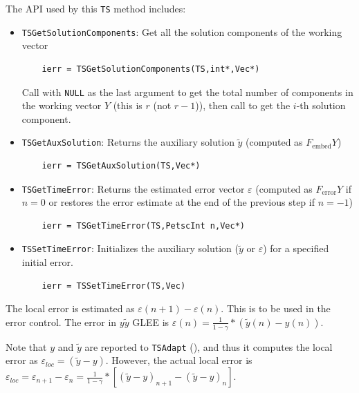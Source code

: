 The API used by this \lstinline{TS} method includes:
\begin{itemize}
  \item \lstinline{TSGetSolutionComponents}: Get all the solution components of the working vector
    \begin{lstlisting}
    ierr = TSGetSolutionComponents(TS,int*,Vec*)
    \end{lstlisting}
    Call with \lstinline{NULL} as the last argument to get the total number of
    components in the working vector $Y$ (this is $r$ (not $r-1$)),
    then call to get the $i$-th solution component. 
  \item \lstinline{TSGetAuxSolution}: Returns the auxiliary solution $\tilde{y}$ (computed as $F_\text{embed} Y$)
    \begin{lstlisting}
    ierr = TSGetAuxSolution(TS,Vec*)
    \end{lstlisting}
  \item \lstinline{TSGetTimeError}: Returns the estimated error vector $\varepsilon$
(computed as $F_\text{error} Y$ if $n=0$ or restores the error estimate at
    the end of the previous step if $n=-1$)
    \begin{lstlisting}
    ierr = TSGetTimeError(TS,PetscInt n,Vec*)
    \end{lstlisting}
  \item \lstinline{TSSetTimeError}: Initializes the auxiliary solution ($\tilde{y}$
or $\varepsilon$) for a specified initial error. 
    \begin{lstlisting}
    ierr = TSSetTimeError(TS,Vec)
    \end{lstlisting}
\end{itemize}

The local error is estimated as $\varepsilon(n+1)-\varepsilon(n)$.
This is to be used in the error control. The error in $y\tilde{y}$
GLEE is $\varepsilon(n) = \frac{1}{1-\gamma} * (\tilde{y}(n) - y(n))$. 

Note that $y$ and $\tilde{y}$ are reported to \lstinline{TSAdapt}  (), and thus it
computes the local error as $\varepsilon_{loc} = (\tilde{y} -
y)$. However, the actual local error is  $\varepsilon_{loc}
= \varepsilon_{n+1} - \varepsilon_n = \frac{1}{1-\gamma} * [(\tilde{y} -
y)_{n+1} - (\tilde{y} - y)_n]$. 

